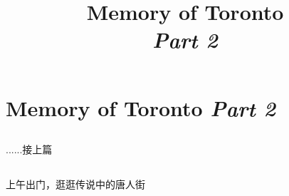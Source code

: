 ﻿\documentclass[hyperref={bookmarks=true},xcolor=pdflatex,svgnames,table,compress]{beamer}
\title{Memory of Toronto\\ \textit{Part 2}}
\author{}
\date{}
\begin{document}
\begin{frame}
\titlepage
\end{frame}

\section{Memory of Toronto {\itshape Part 2}}

\subsection{}
\begin{frame}
\begin{ztebox}
......接上篇
\end{ztebox}
\end{frame}

\subsection{}
\begin{frame}
\begin{center}
\end{center}
\end{frame}

\subsection{}
\begin{frame}
\begin{ztebox}
上午出门，逛逛传说中的唐人街
\end{ztebox}
\end{frame}

\subsection{}
\begin{frame}
\end{frame}

\subsection{}
\begin{frame}
\end{frame}

\subsection{}
\begin{frame}
\end{frame}
\end{document}
